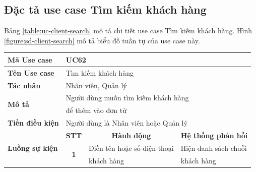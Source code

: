 \documentclass[../DoAn.tex]{subfiles}
\begin{document}
\subsection{Đặc tả use case Tìm kiếm khách hàng}
\label{section:uc-client-search}
Bảng \ref{table:uc-client-search} mô tả chi tiết use case Tìm kiếm khách hàng. Hình \ref{figure:sd-client-search} mô tả biểu đồ tuần tự của use case này.
\begin{table}[H]
    \begin{tabular}{|l|c|l|l|}
        \hline
        \textbf{Mã Use case}                    & \multicolumn{3}{l|}{UC62}                                                                                                                               \\ \hline
        \textbf{Tên Use case}                   & \multicolumn{3}{l|}{Tìm kiếm khách hàng}                                                                                                                \\ \hline
        \textbf{Tác nhân}                       & \multicolumn{3}{l|}{Nhân viên, Quản lý}                                                                                                                 \\ \hline
        \multirow{2}{*}{\textbf{Mô tả} }        & \multicolumn{3}{l|}{Người dùng muốn tìm kiếm khách hàng}                                                                                                \\
                                                & \multicolumn{3}{l|}{để thêm vào đơn từ}                                                                                                                 \\ \hline
        \textbf{Tiền điều kiện}                 & \multicolumn{3}{l|}{Người dùng là Nhân viên hoặc Quản lý}                                                                                               \\ \hline
        \multirow{4}{*}{\textbf{Luồng sự kiện}} & \multicolumn{1}{c|}{\textbf{STT}}                           & \multicolumn{1}{c|}{\textbf{Hành động}} & \multicolumn{1}{c|}{\textbf{Hệ thống phản hồi}} \\ \cline{2-4}
                                                & \multirow{3}{*}{\textbf{1}}                                 & Điền tên hoặc số điện thoại             & Hiện danh sách chuỗi                            \\
                                                &                                                             & khách hàng                              & khách hàng                                      \\

\end{tabular}
\end{table}
\end{document}
